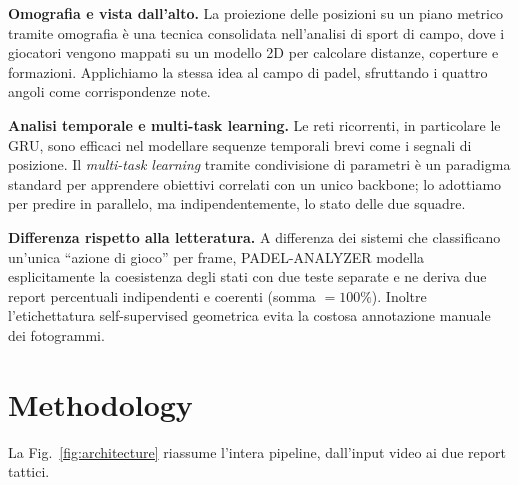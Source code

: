 \documentclass[10pt,twocolumn,a4paper]{article}
\begin{document}
	\textbf{Omografia e vista dall'alto.} La proiezione delle posizioni su un
	piano metrico tramite omografia è una tecnica consolidata nell'analisi di
	sport di campo, dove i giocatori vengono mappati
	su un modello 2D per calcolare distanze, coperture e formazioni. Applichiamo
	la stessa idea al campo di padel, sfruttando i quattro angoli come
	corrispondenze note.

	\textbf{Analisi temporale e multi-task learning.} Le reti ricorrenti, in
	particolare le GRU, sono efficaci nel modellare sequenze
	temporali brevi come i segnali di posizione. Il \emph{multi-task
	learning} tramite condivisione di parametri è un
	paradigma standard per apprendere obiettivi correlati con un unico backbone;
	lo adottiamo per predire in parallelo, ma indipendentemente, lo stato delle
	due squadre.

	\textbf{Differenza rispetto alla letteratura.} A differenza dei sistemi che
	classificano un'unica ``azione di gioco'' per frame, PADEL-ANALYZER modella
	esplicitamente la coesistenza degli stati con due teste separate e ne deriva
	due report percentuali indipendenti e coerenti (somma $=100\%$). Inoltre
	l'etichettatura self-supervised geometrica evita la costosa annotazione
	manuale dei fotogrammi.

	\section{Methodology}
	\label{sec:method}

	La Fig.~\ref{fig:architecture} riassume l'intera pipeline, dall'input video
	ai due report tattici.
\end{document}
